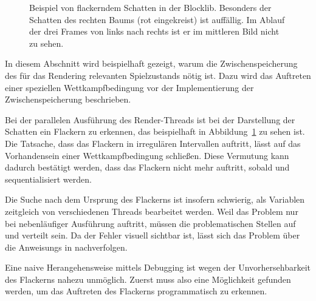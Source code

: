 \begin{figure}
	\hfill
	\hfill
	\caption[Beispiel von flackerndem Schatten in der Blocklib.]{Beispiel von flackerndem Schatten in der Blocklib. Besonders der Schatten des rechten Baums (rot eingekreist) ist auffällig. Im Ablauf der drei Frames von links nach rechts ist er im mittleren Bild nicht zu sehen.}\label{fig:flackern}
\end{figure}
In diesem Abschnitt wird beispielhaft gezeigt, warum die Zwischenspeicherung des für das Rendering relevanten Spielzustands nötig ist. Dazu wird das Auftreten einer speziellen Wettkampfbedingung vor der Implementierung der Zwischenspeicherung beschrieben. 

Bei der parallelen Ausführung des Render-Threads ist bei der Darstellung der Schatten ein Flackern zu erkennen, das beispielhaft in Abbildung~\ref{fig:flackern} zu sehen ist. Die Tatsache, dass das Flackern in irregulären Intervallen auftritt, lässt auf das Vorhandensein einer Wettkampfbedingung schließen. Diese Vermutung kann dadurch bestätigt werden, dass das Flackern nicht mehr auftritt, sobald  und  sequentialisiert werden.

Die Suche nach dem Ursprung des Flackerns ist insofern schwierig, als Variablen zeitgleich von verschiedenen Threads bearbeitet werden. Weil das Problem nur bei nebenläufiger Ausführung auftritt, müssen die problematischen Stellen auf  und  verteilt sein. Da der Fehler visuell sichtbar ist, lässt sich das Problem über die \glspl{Anweisung} in  nachverfolgen. 

Eine naive Herangehensweise mittels Debugging ist wegen der Unvorhersehbarkeit des Flackerns nahezu unmöglich. Zuerst muss also eine Möglichkeit gefunden werden, um das Auftreten des Flackerns programmatisch zu erkennen.

